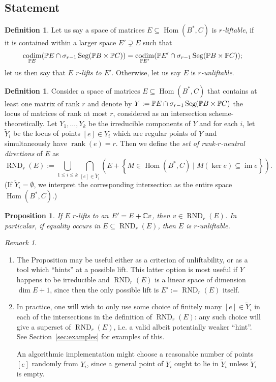 \documentclass[a4paper,10pt]{article}
\def\zav#1{\left(#1\right)}
\def\set#1{\left\{#1\right\}}
\DeclareMathOperator{\Hom}{Hom}\let\hom\Hom
\DeclareMathOperator{\rank}{rank}\let\rk\rank
\DeclareMathOperator{\im}{im}
\DeclareMathOperator{\codim}{codim}
\DeclareMathOperator{\RND}{RND}
\DeclareMathOperator{\Seg}{Seg}
\def\uv#1{``#1''}
\newtheorem{prop}[theorem]{Proposition}
\theoremstyle{definition}
\newtheorem{definition}[theorem]{Definition}
\theoremstyle{remark}
\newtheorem*{remark}{Remark}
\begin{document}
\subsection{Statement}

\begin{definition}
    Let us say a space of matrices $E\subseteq \Hom(B^*,C)$ is \emph{$r$-liftable}, if it is contained within a larger space $E'\supsetneq E$ such that
    \[
        \codim_{\pe E}(\pe E\cap \sigma_{r-1}\Seg(\pe B\times\pe C)) = \codim_{\pe E'}({\pe E'}\cap \sigma_{r-1}\Seg(\pe B\times\pe C));
    \]
    let us then say that \emph{$E$ $r$-lifts to $E'$}.
    Otherwise, let us say $E$ is \emph{$r$-unliftable}.
\end{definition}

\begin{definition}
    Consider a space of matrices $E\subseteq \Hom(B^*,C)$ that contains at least one matrix of rank $r$ and denote by $Y:= \pe E\cap\sigma_{r-1}\Seg(\pe B\times\pe C)$ the locus of matrices of rank at most $r$, considered as an intersection scheme-theoretically. Let $Y_1,\dots, Y_k$ be the irreducible components of $Y$ and for each $i$, let $\tilde Y_i$ be the locus of points $[e]\in Y_i$ which are regular points of $Y$ and simultaneously have $\rank(e) = r$.  Then we define the \emph{set of rank-$r$-neutral directions} of $E$ as
    \[
        \RND_r(E) := \bigcup_{1\leq i\leq k} \bigcap_{[e]\in \tilde Y_i} \zav{E + \set{M\in \Hom(B^*,C)\mid M(\ker e)\subseteq \im e}}.
    \]
    (If $\tilde Y_i=\emptyset$, we interpret the corresponding intersection as the entire space $\Hom(B^*,C)$.)
\end{definition}
%
\begin{prop}
    \label{prp:main-liftability}
    If $E$ $r$-lifts to an $E'=E+\ce v$, then $v\in \RND_r(E)$. In particular, if equality occurs in  $E\subseteq \RND_r(E)$, then $E$ is $r$-unliftable.
\end{prop}
\begin{remark}
    \begin{enumerate}
        \item The Proposition may be useful either as a criterion of unliftability, or as a tool which \uv{hints} at a possible lift. This latter option is most useful if $Y$ happens to be irreducible and $\RND_r(E)$ is a linear space of dimension $\dim E+1$, since then the only possible lift is $E':=\RND_r(E)$ itself.
        \item In practice, one will wish to only use some choice of finitely many $[e]\in\tilde Y_i$ in each of the intersections in the definition of $\RND_r(E)$: any such choice will give a superset of $\RND_r(E)$, i.e. a valid albeit potentially weaker \uv{hint}. See Section~\ref{sec:examples} for examples of this.

        An algorithmic implementation might choose a reasonable number of points $[e]$ randomly from $Y_i$, since a general point of $Y_i$ ought to lie in $\tilde Y_i$ unless $\tilde Y_i$ is empty.
    \end{enumerate}
\end{remark}
\end{document}
